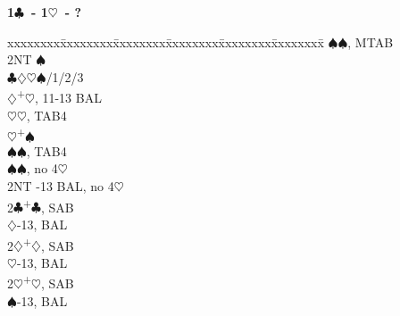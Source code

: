 \documentclass[10pt]{article}
\renewcommand{\c}{$\clubsuit$}
\renewcommand{\d}{$\diamondsuit$}
\newcommand{\h}{$\heartsuit$}
\newcommand{\s}{$\spadesuit$}
\newcommand{\p}{\textsuperscript{+}}
\newenvironment{bidtable}[1][]
{\textbf{#1}
  \begin{adjustwidth}{1em}{}
    \addvspace{2pt}
    \begin{tabbing}
      xxxxxxxx\=xxxxxxxx\=xxxxxxxx\=xxxxxxxx\=xxxxxxxx\=xxxxxxxx\=\kill}
{\end{tabbing}\end{adjustwidth}\bigskip}%
\begin{document}
\begin{multicols*}{2}
\begin{bidtable}[1\c\ - 1\h\ - ?]
    \>     \s  {}\s, MTAB                     \\
    \>     \>      \> 2NT       \s              \\
    \>     \>      \c\d\h\s {}/1/2/3          \\
    \d {}\p\h, 11-13 BAL                      \\
    \>     \h  {}\h, TAB4                     \\
    \h {}\p\s                                 \\
    \>     \s  {}\s, TAB4                     \\
    \s {}\s, no 4\h                           \\
    \> 2NT -13 BAL, no 4\h                     \\
2\c {}\p\c, SAB                                        \\
    \d {}-13, BAL                            \\
2\d {}\p\d, SAB                                        \\
    \h {}-13, BAL                            \\
2\h {}\p\h, SAB                                        \\
    \s {}-13, BAL
\end{bidtable}


\end{multicols*}
\end{document}
